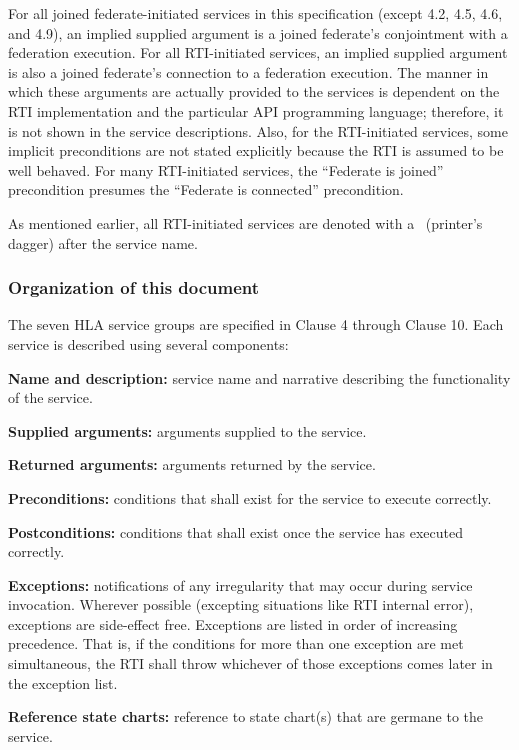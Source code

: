 For all joined federate-initiated services in this specification (except 4.2, 4.5, 4.6, and 4.9), an implied supplied argument is a joined federate's conjointment with a federation execution. For all RTI-initiated services, an implied supplied argument is also a joined federate's connection to a federation execution. The manner in which these arguments are actually provided to the services is dependent on the RTI implementation and the particular API programming language; therefore, it is not shown in the service descriptions. Also, for the RTI-initiated services, some implicit preconditions are not stated explicitly because the RTI is assumed to be well behaved. For many RTI-initiated services, the ``Federate is joined'' precondition presumes the ``Federate is connected'' precondition.

As mentioned earlier, all RTI-initiated services are denoted with a \rtiinitiated\ (printer's dagger) after the service name.

\subsubsection{Organization of this document}

The seven HLA service groups are specified in Clause 4 through Clause 10. Each service is described using several components:

\begin{stddashlist}
    \item \textbf{Name and description:} service name and narrative describing the functionality of the service.
    \item \textbf{Supplied arguments:} arguments supplied to the service.
    \item \textbf{Returned arguments:} arguments returned by the service.
    \item \textbf{Preconditions:} conditions that shall exist for the service to execute correctly.
    \item \textbf{Postconditions:} conditions that shall exist once the service has executed correctly.
    \item \textbf{Exceptions:} notifications of any irregularity that may occur during service invocation. Wherever possible (excepting situations like RTI internal error), exceptions are side-effect free. Exceptions are listed in order of increasing precedence. That is, if the conditions for more than one exception are met simultaneous, the RTI shall throw whichever of those exceptions comes later in the exception list.
    \item \textbf{Reference state charts:} reference to state chart(s) that are germane to the service.
\end{stddashlist}

